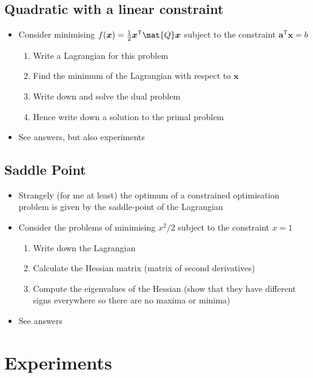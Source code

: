 \documentclass[11pt]{article}
\newcommand{\tr}{\textsf{T}}
\begin{document}
\subsection{Quadratic with a linear constraint}
\label{sec:orgdc9fdf5}
\begin{itemize}
\item Consider minimising \(f(\bm{x}) = \tfrac{1}{2} \bm{x}^\tr \mat{Q} \bm{x}\)
subject to the constraint \(\bm{a}^\tr\bm{x} = b\)
\begin{enumerate}
\item Write a Lagrangian for this problem
\item Find the minimum of the Lagrangian with respect to \(\bm{x}\)
\item Write down and solve the dual problem
\item Hence write down a solution to the primal problem
\end{enumerate}
\item See answers, but also experiments
\end{itemize}

\subsection{Saddle Point}
\label{sec:org0e8fdc3}
\begin{itemize}
\item Strangely (for me at least) the optimum of a constrained
optimisation problem is given by the saddle-point of the Lagrangian
\item Consider the problems of minimising \(x^2/2\) subject to the
constraint \(x=1\)
\begin{enumerate}
\item Write down the Lagrangian
\item Calculate the Hessian matrix (matrix of second derivatives)
\item Compute the eigenvalues of the Hessian (show that they have
different signs everywhere so there are  no maxima or minima)
\end{enumerate}
\item See answers
\end{itemize}

\section{Experiments}
\label{sec:org21d1566}
\end{document}
